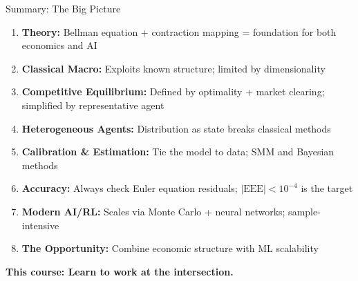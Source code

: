 \documentclass[10pt,english,aspectratio=169]{beamer}
\begin{document}
\begin{frame}{Summary: The Big Picture}
\begin{enumerate}
\item \textbf{Theory:} Bellman equation + contraction mapping = foundation for both economics and AI

\medskip
\item \textbf{Classical Macro:} Exploits known structure; limited by dimensionality

\medskip
\item \textbf{Competitive Equilibrium:} Defined by optimality + market clearing; simplified by representative agent

\medskip
\item \textbf{Heterogeneous Agents:} Distribution as state breaks classical methods

\medskip
\item \textbf{Calibration \& Estimation:} Tie the model to data; SMM and Bayesian methods

\medskip
\item \textbf{Accuracy:} Always check Euler equation residuals; $|\text{EEE}| < 10^{-4}$ is the target

\medskip
\item \textbf{Modern AI/RL:} Scales via Monte Carlo + neural networks; sample-intensive

\medskip
\item \textbf{The Opportunity:} Combine economic structure with ML scalability
\end{enumerate}

\bigskip
\begin{center}
\textbf{This course: Learn to work at the intersection.}
\end{center}
\end{frame}
\end{document}
